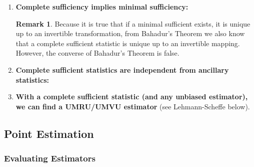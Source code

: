 \documentclass{article}
\theoremstyle{definition}
\newtheorem{theorem}{Theorem}
\theoremstyle{definition}
\theoremstyle{definition}
\theoremstyle{definition}
\theoremstyle{definition}
\newtheorem*{remark}{Remark}
\theoremstyle{definition}
\theoremstyle{definition}
\begin{document}
\begin{enumerate}[(1)]

\item \textbf{Complete sufficiency implies minimal sufficiency:}

\noindent{}

\begin{remark}Because it is true that if a minimal sufficient exists, it is unique up to an invertible transformation, from Bahadur's Theorem we also know that a complete sufficient statistic is unique up to an invertible mapping. However, the converse of Bahadur's Theorem is false.

\end{remark}

\item \textbf{Complete sufficient statistics are independent from ancillary statistics:}

\noindent{}

\item \textbf{With a complete sufficient statistic (and any unbiased estimator), we can find a UMRU/UMVU estimator} (see Lehmann-Scheffe below).

\end{enumerate}

\subsection{Point Estimation}

\subsubsection{Evaluating Estimators}
\end{document}
